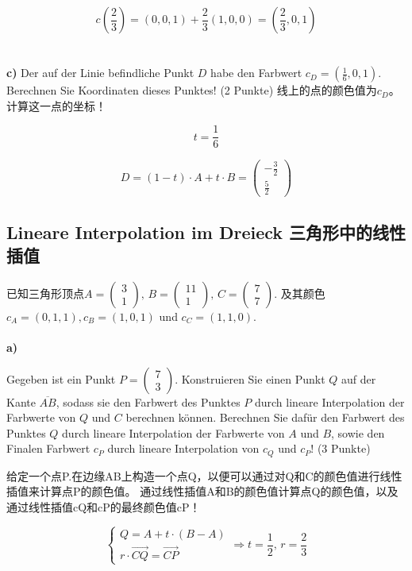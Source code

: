\documentclass[fleqn]{article}
\begin{document}
$$c(\frac{2}{3})=(0,0,1)+\frac{2}{3}(1,0,0)=(\frac{2}{3},0,1)$$
\\
\\
\textbf{c)}
Der auf der Linie befindliche Punkt $D$ habe den Farbwert $c_D = (\frac{1}{6},0,1)$. Berechnen Sie Koordinaten dieses Punktes! (2 Punkte)
线上的点的颜色值为$c_D$。 计算这一点的坐标！

$$t=\frac{1}{6}$$

$$D=(1-t)\cdot A + t\cdot B = \begin{pmatrix}
    -\frac{3}{2}\\\frac{5}{2}
\end{pmatrix}$$

\subsection{Lineare Interpolation im Dreieck 三角形中的线性插值}

已知三角形顶点$A=\begin{pmatrix}
    3\\1
\end{pmatrix},\,B=\begin{pmatrix}
    11\\1
\end{pmatrix},\,C=\begin{pmatrix}
    7\\7
\end{pmatrix}$. 及其颜色$c_A = (0, 1, 1), c_B = (1, 0, 1)$ und $c_C = (1, 1, 0)$. 
\\
\\
\textbf{a)} 

Gegeben ist ein Punkt $P=\begin{pmatrix}
    7\\3
\end{pmatrix}$. Konstruieren Sie einen Punkt $Q$ auf der Kante $\overline{AB}$, sodass sie den Farbwert des Punktes $P$ durch lineare Interpolation der Farbwerte von $Q$ und $C$ berechnen können. Berechnen Sie dafür den Farbwert des Punktes $Q$ durch lineare Interpolation der Farbwerte von $A$ und $B$, sowie den Finalen Farbwert $c_P$ durch lineare Interpolation von $c_Q$ und $c_P$! (3 Punkte)

给定一个点P.在边缘AB上构造一个点Q，以便可以通过对Q和C的颜色值进行线性插值来计算点P的颜色值。 通过线性插值A和B的颜色值计算点Q的颜色值，以及通过线性插值cQ和cP的最终颜色值cP！

$$\left\{
    \begin{aligned}
        Q=A+t\cdot(B-A)\\
        r\cdot\overrightarrow{CQ}=\overrightarrow{CP}
    \end{aligned}
\right.\Rightarrow t=\frac{1}{2},\,r=\frac{2}{3}$$
\end{document}
